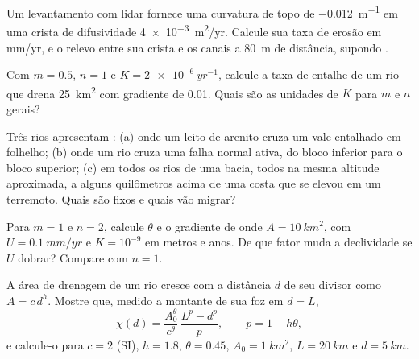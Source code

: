 \begin{exercise}[$\star$]\label{exo:b3:quantitative-geomorphology:2}
Um levantamento com lidar fornece uma curvatura de topo de \qty{-0.012}{m^{-1}} em uma crista
de difusividade \qty{4e-3}{m^2/yr}. Calcule sua taxa de erosão em
\unit{mm/yr}, e o relevo entre sua crista e os canais
a \qty{80}{m} de distância, supondo .
\end{exercise}

\begin{exercise}[$\star$]\label{exo:b3:quantitative-geomorphology:3}
Com $m = 0.5$, $n = 1$ e $K = \qty{2e-6}{yr^{-1}}$, calcule a
taxa de entalhe de um rio que drena \qty{25}{km^2} com gradiente de 0.01.
Quais são as unidades de $K$ para $m$ e $n$ gerais?
\end{exercise}

\begin{exercise}[$\star$]\label{exo:b3:quantitative-geomorphology:4}
Três rios apresentam \textit{}: (a) onde um leito de arenito cruza um vale
entalhado em folhelho; (b) onde um rio cruza uma falha normal ativa, do
bloco inferior para o bloco superior; (c) em todos os rios de uma bacia, todos
na mesma altitude aproximada, a alguns quilômetros acima de uma costa que se
elevou em um terremoto. Quais são fixos e quais vão migrar?
\end{exercise}

\begin{exercise}[$\star\star$]\label{exo:b3:quantitative-geomorphology:5}
Para $m = 1$ e $n = 2$, calcule $\theta$ e o gradiente de  onde $A =
\qty{10}{km^2}$, com $U = \qty{0.1}{mm/yr}$ e $K = 10^{-9}$ em metros e
anos.
De que fator muda a declividade se $U$ dobrar? Compare com $n =
1$.
\end{exercise}

\begin{exercise}[$\star\star$]\label{exo:b3:quantitative-geomorphology:6}
A área de drenagem de um rio cresce com a distância $d$ de seu divisor como $A =
c\,d^{h}$. Mostre que, medido a montante de sua foz em $d = L$,
\[
\chi(d) = \frac{A_0^{\theta}}{c^{\theta}}\,\frac{L^{p} - d^{p}}{p},
\qquad p = 1 - h\theta ,
\]
e calcule-o para $c = 2$ (SI), $h = 1.8$, $\theta = 0.45$, $A_0 =
\qty{1}{km^2}$, $L = \qty{20}{km}$ e $d = \qty{5}{km}$.
\end{exercise}

